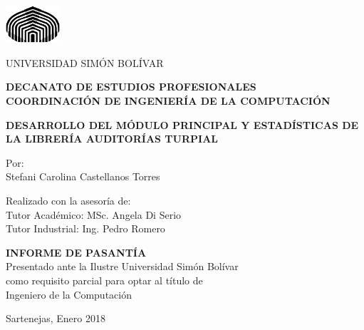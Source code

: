 \thispagestyle{empty}

\begin{center}
    \begin{singlespace}
        \includegraphics[width=2cm]{logo_USB}
        
        {\large
          UNIVERSIDAD SIMÓN BOLÍVAR\\
        }
        
        \textbf{
          DECANATO DE ESTUDIOS PROFESIONALES\\
          COORDINACIÓN DE INGENIERÍA DE LA COMPUTACIÓN
        }
        
        \vspace{4cm}%
        \textbf{
          DESARROLLO DEL MÓDULO PRINCIPAL Y ESTADÍSTICAS DE LA LIBRERÍA AUDITORÍAS TURPIAL
        }
        \vspace{4cm}
        
        Por:\\
        Stefani Carolina Castellanos Torres
        
        \vspace{1cm}
        Realizado con la asesoría de:\\
        Tutor Académico: MSc. Angela Di Serio\\
        Tutor Industrial: Ing. Pedro Romero
        
        \vspace{2cm}
          \textbf{INFORME DE PASANTÍA}\\
          Presentado ante la Ilustre Universidad Simón Bolívar\\
          como requisito parcial para optar al título de\\
          Ingeniero de la Computación\\
        \selectfont
        
        \vspace{3cm}
    Sartenejas, Enero 2018
    
    \end{singlespace}
\end{center}


